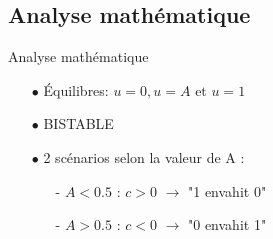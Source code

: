\documentclass[10pt]{beamer}
\begin{document}
\subsection{Analyse mathématique}
\begin{frame}{Analyse mathématique}{}
\begin{itemize}
	\item[$\bullet$] Équilibres: $u=0, u=A \text{ et } u=1$
	\item[$\bullet$] BISTABLE
	\item[$\bullet$] 2 scénarios selon la valeur de A :
	\begin{itemize}
		\item[-] $A<0.5$ : $c>0$ $\rightarrow$ "1 envahit 0"
		\item[-] $A>0.5$ : $c<0$ $\rightarrow$ "0 envahit 1"
	\end{itemize}
\end{itemize}
\end{frame}
\end{document}
